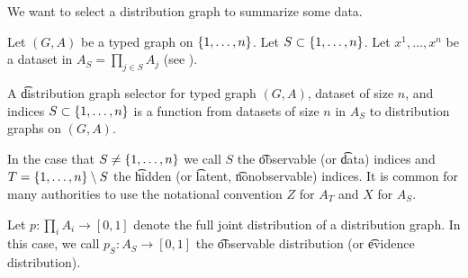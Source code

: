 

We want to select a distribution graph to summarize some data.


Let $(G, A)$ be a typed graph on $\{1, \dots, n\}$.
Let $S \subset \{1, \dots, n\}$.
Let $x^1, \dots, x^n$ be a dataset in $A_S = \prod_{j \in S} A_j$ (see ).

A \t{distribution graph selector} for typed graph $(G, A)$, dataset of size $n$, and indices $S \subset\{1, \dots, n\}$ is a function from datasets of size $n$ in $A_S$ to distribution graphs on $(G, A)$.

In the case that $S \neq\{1, \dots, n\}$ we call $S$ the \t{observable} (or \t{data}) indices and $T = \{1,\dots,n\} \setminus S$ the \t{hidden} (or \t{latent}, \t{nonobservable}) indices.
It is common for many authorities to use the notational convention $Z$ for $A_T$ and $X$ for $A_S$.

Let $p: \prod_{i} A_i \to [0, 1]$ denote the full joint distribution of a distribution graph.
In this case, we call $p_{S}: A_S \to [0, 1]$ the \t{observable distribution} (or \t{evidence distribution}).


%

\blankpage
